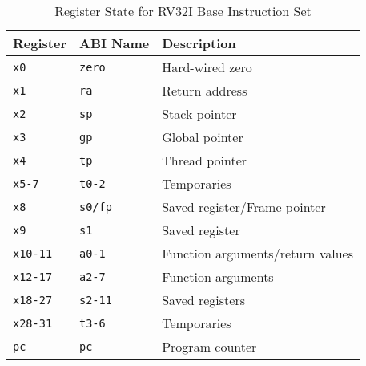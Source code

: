 \begin{table}[H]
\begin{center}
\begin{tabular}{|p{.15\linewidth}|p{.15\linewidth}|p{.4\linewidth}|}
    \hline
    \textbf{Register}   & \textbf{ABI Name}  & \textbf{Description} \\
    \hline
    \texttt{x0}  & \texttt{zero} & Hard-wired zero \\
    \texttt{x1}& \texttt{ra}& Return address\\
    \texttt{x2}& \texttt{sp} & Stack pointer\\
    \texttt{x3}& \texttt{gp}&Global pointer\\
    \texttt{x4}& \texttt{tp}& Thread pointer\\
    \texttt{x5-7}& \texttt{t0-2}&Temporaries\\
    \texttt{x8}& \texttt{s0/fp}&Saved register/Frame pointer\\
    \texttt{x9}&\texttt{s1} &Saved register\\
    \texttt{x10-11}&\texttt{a0-1}&Function arguments/return values\\
    \texttt{x12-17}&\texttt{a2-7}&Function arguments\\
    \texttt{x18-27}&\texttt{s2-11}&Saved registers\\
    \texttt{x28-31}&\texttt{t3-6}&Temporaries\\
    \hline
    \texttt{pc} & \texttt{pc} & Program counter \\
    \hline
\end{tabular}
\caption{Register State for RV32I Base Instruction Set}
\label{table:rv32i_reg}
\end{center}
\end{table}